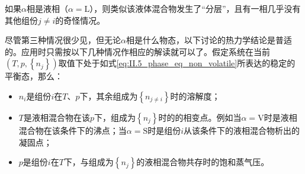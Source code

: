 \documentclass[main.tex]{subfiles}
\begin{document}
如果$\alpha$相是液相（$\alpha=\text{L}$），则类似该液体混合物发生了“分层”，且有一相几乎没有其他组份$j\neq i$的奇怪情况。

尽管第三种情况很少见，但无论$\alpha$相是什么物态，以下讨论的热力学结论是普适的。应用时只需按以下几种情况作相应的解读就可以了。假定系统在当前$\left(T,p,\left\{n_j\right\}\right)$取值下处于如式\eqref{eq:II.5_phase_eq_non_volatile}所表达的稳定的平衡态，那么：
\begin{itemize}
  \item $n_i$是组份$i$在$T$、$p$下，其余组成为$\left\{n_{j\neq i}\right\}$时的溶解度；
  \item $T$是液相混合物在该$p$下，组成为$\left\{n_j\right\}$时的的相变点。例如当$\alpha=\text{V}$时是液相混合物在该条件下的沸点；当$\alpha=\text{S}$时是组份$i$从该条件下的液相混合物析出的凝固点；
  \item $p$是组份$i$在$T$下，与组成为$\left\{n_j\right\}$的液相混合物共存时的饱和蒸气压。
\end{itemize}
\end{document}
